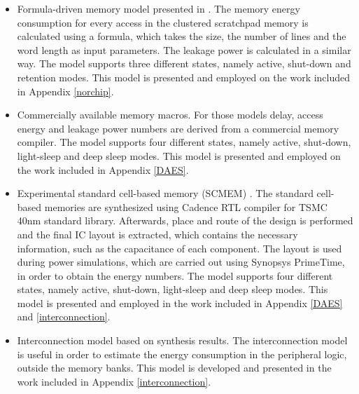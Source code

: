 \begin{itemize}
\item Formula-driven memory model presented in \cite{Artes2011}.
The memory energy consumption for every access in the clustered scratchpad memory is calculated using a formula, which takes the size, the number of lines and the word length as input parameters.
The leakage power is calculated in a similar way.
The model supports three different states, namely active, shut-down and retention modes.
This model is presented and employed on the work included in Appendix \ref{norchip}.

\item Commercially available memory macros.  
For those models delay, access energy and leakage power numbers are derived from a commercial memory compiler.
The model supports four different states, namely active, shut-down, light-sleep and deep sleep modes.
This model is presented and employed on the work included in Appendix \ref{DAES}.

\item Experimental standard cell-based memory (SCMEM)  \cite{Mei11} .
The standard cell-based memories are synthesized using Cadence RTL compiler for TSMC 40nm standard library.
Afterwards, place and route of the design is performed and the final IC layout is extracted, which contains the necessary information, such as the capacitance of each component.
The layout is used during power simulations, which are carried out using Synopsys PrimeTime, in order to obtain the energy numbers.
The model supports four different states, namely active, shut-down, light-sleep and deep sleep modes.
This model is presented and employed in the work included in Appendix \ref{DAES} and \ref{interconnection}.

\item Interconnection model based on synthesis results.
The interconnection model is useful in order to estimate the energy consumption in the peripheral logic, outside the memory banks.
This model is developed and presented in the work included in Appendix \ref{interconnection}.

\end{itemize}

